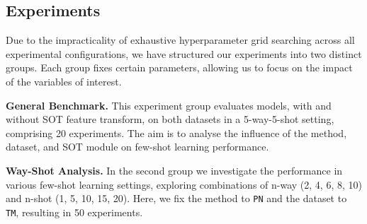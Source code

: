 \subsection{Experiments}

Due to the impracticality of exhaustive hyperparameter grid searching across all experimental configurations, 
we have structured our experiments into two distinct groups. Each group fixes certain parameters, allowing us to focus on the impact of the variables of interest.

\textbf{General Benchmark.} This experiment group evaluates models, with and without SOT feature transform, on both datasets in a 5-way-5-shot setting, 
comprising 20 experiments. The aim is to analyse the influence of the method, dataset, and SOT module on few-shot learning performance.

\textbf{Way-Shot Analysis.} In the second group we investigate the performance in various few-shot learning settings, exploring combinations of n-way ({2, 4, 6, 8, 10}) 
and n-shot ({1, 5, 10, 15, 20}). Here, we fix the method to \texttt{PN} and the dataset to \texttt{TM}, resulting in 50 experiments.